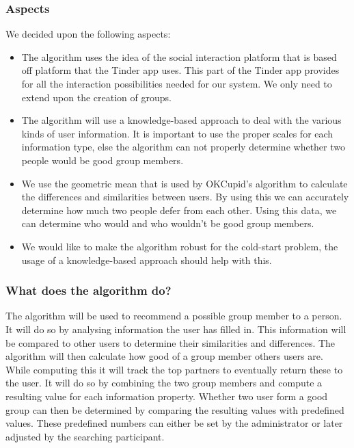 \documentclass[]{article}
\begin{document}
\subsubsection{Aspects}
We decided upon the following aspects:
\begin{itemize}
\item The algorithm uses the idea of the social interaction platform that is based off platform that the Tinder app uses.
This part of the Tinder app provides for all the interaction possibilities needed for our system.
We only need to extend upon the creation of groups.
\item The algorithm will use a knowledge-based approach to deal with the various kinds of user information.
It is important to use the proper scales for each information type, else the algorithm can not properly determine whether two people would be good group members.
\item We use the geometric mean that is used by OKCupid's algorithm to calculate the differences and similarities between users.
By using this we can accurately determine how much two people defer from each other.
Using this data, we can determine who would and who wouldn't be good group members.
\item We would like to make the algorithm robust for the cold-start problem, the usage of a knowledge-based approach should help with this.
\end{itemize}

\subsubsection{What does the algorithm do?}
The algorithm will be used to recommend a possible group member to a person.
It will do so by analysing information the user has filled in.
This information will be compared to other users to determine their similarities and differences.
The algorithm will then calculate how good of a group member others users are.
While computing this it will track the top partners to eventually return these to the user.
It will do so by combining the two group members and compute a resulting value for each information property.
Whether two user form a good group can then be determined by comparing the resulting values with predefined values.
These predefined numbers can either be set by the administrator or later adjusted by the searching participant.
\end{document}
